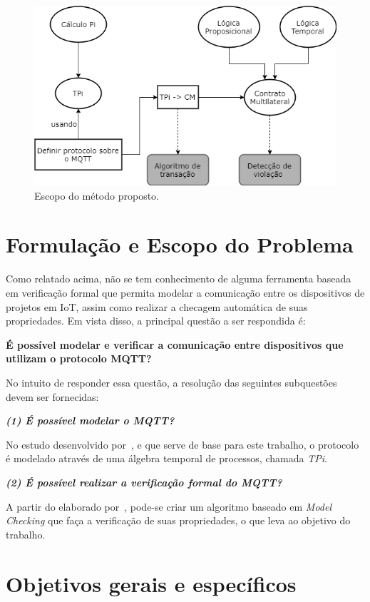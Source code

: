 \begin{figure}[ht]
	\centering
	\includegraphics[width=1\textwidth]{imagens/tcc_estrutura.png}
	\caption{Escopo do método proposto.
		\label{fig:tcc_escopo}}
\end{figure}
\FloatBarrier

\section{Formulação e Escopo do Problema}

Como relatado acima, não se tem conhecimento de alguma ferramenta baseada em verificação formal que permita modelar a comunicação entre os dispositivos de projetos em IoT, assim como realizar a checagem automática de suas propriedades. Em vista disso, a principal questão a ser respondida é:

\textbf{É possível modelar e verificar a comunicação entre dispositivos que utilizam o protocolo MQTT?}

No intuito de responder essa questão, a resolução das seguintes subquestões devem ser fornecidas:

\textbf{\textit{(1) É possível modelar o MQTT?}}


No estudo desenvolvido por~\citeauthor{aziz2016formal}, e que serve de base para este trabalho, o protocolo é modelado através de uma álgebra temporal de processos, chamada \textit{TPi}.

\textbf{\textit{(2) É possível realizar a verificação formal do MQTT?}}

A partir do elaborado por~\citeauthor{aziz2016formal}, pode-se criar um algoritmo baseado em \textit{Model Checking} que faça a verificação de suas propriedades, o que leva ao objetivo do trabalho.

\section{Objetivos gerais e específicos}

